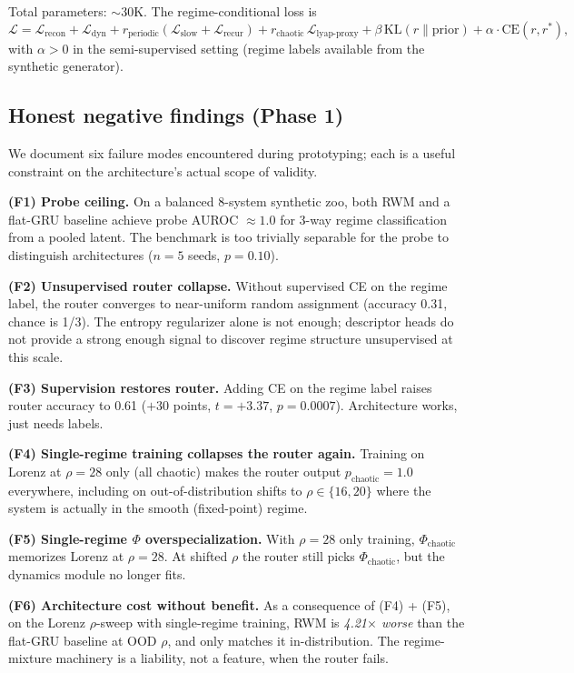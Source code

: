 \documentclass[11pt,a4paper]{article}
\begin{document}
Total parameters: $\sim$30K. The regime-conditional loss is
$$
\mathcal{L} = \mathcal{L}_\text{recon} + \mathcal{L}_\text{dyn}
+ r_\text{periodic}(\mathcal{L}_\text{slow} + \mathcal{L}_\text{recur})
+ r_\text{chaotic}\, \mathcal{L}_\text{lyap-proxy}
+ \beta\, \mathrm{KL}(r \| \mathrm{prior}) + \alpha \cdot \mathrm{CE}(r, r^*),
$$
with $\alpha > 0$ in the semi-supervised setting (regime labels
available from the synthetic generator).

\subsection{Honest negative findings (Phase 1)}

We document six failure modes encountered during prototyping; each is
a useful constraint on the architecture's actual scope of validity.

\textbf{(F1) Probe ceiling.} On a balanced 8-system synthetic zoo,
both RWM and a flat-GRU baseline achieve probe AUROC $\approx 1.0$
for 3-way regime classification from a pooled latent. The benchmark
is too trivially separable for the probe to distinguish architectures
($n=5$ seeds, $p=0.10$).

\textbf{(F2) Unsupervised router collapse.} Without supervised CE on
the regime label, the router converges to near-uniform random
assignment (accuracy 0.31, chance is 1/3). The entropy regularizer
alone is not enough; descriptor heads do not provide a strong enough
signal to discover regime structure unsupervised at this scale.

\textbf{(F3) Supervision restores router.} Adding CE on the regime
label raises router accuracy to 0.61 ($+30$ points, $t=+3.37$,
$p=0.0007$). Architecture works, just needs labels.

\textbf{(F4) Single-regime training collapses the router again.}
Training on Lorenz at $\rho=28$ only (all chaotic) makes the router
output $p_\text{chaotic}=1.0$ everywhere, including on out-of-distribution
shifts to $\rho \in \{16, 20\}$ where the system is actually in the
smooth (fixed-point) regime.

\textbf{(F5) Single-regime $\Phi$ overspecialization.} With $\rho=28$
only training, $\Phi_\text{chaotic}$ memorizes Lorenz at $\rho=28$.
At shifted $\rho$ the router still picks $\Phi_\text{chaotic}$, but
the dynamics module no longer fits.

\textbf{(F6) Architecture cost without benefit.} As a consequence of
(F4) + (F5), on the Lorenz $\rho$-sweep with single-regime training,
RWM is \emph{4.21$\times$ worse} than the flat-GRU baseline at OOD
$\rho$, and only matches it in-distribution. The regime-mixture
machinery is a liability, not a feature, when the router fails.
\end{document}
